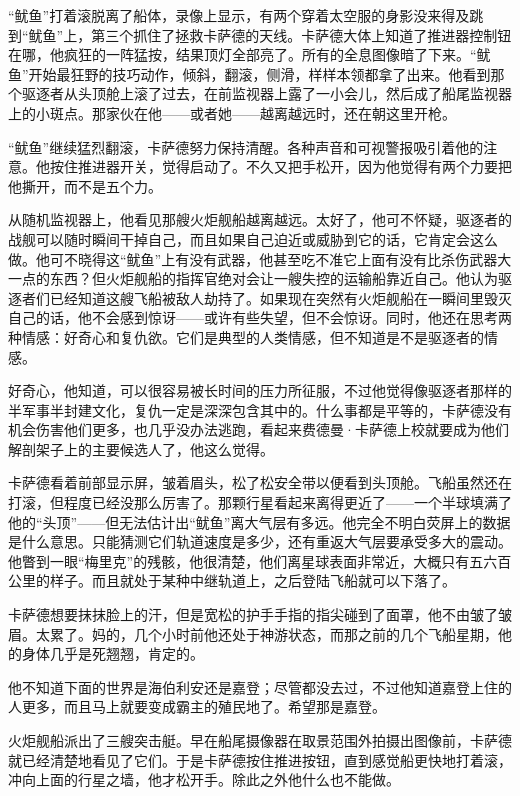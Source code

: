 \documentclass[AutoFakeBold=true]{book}
\begin{document}
``鱿鱼''打着滚脱离了船体，录像上显示，有两个穿着太空服的身影没来得及跳到``鱿鱼''上，第三个抓住了拯救卡萨德的天线。卡萨德大体上知道了推进器控制钮在哪，他疯狂的一阵猛按，结果顶灯全部亮了。所有的全息图像暗了下来。``鱿鱼''开始最狂野的技巧动作，倾斜，翻滚，侧滑，样样本领都拿了出来。他看到那个驱逐者从头顶舱上滚了过去，在前监视器上露了一小会儿，然后成了船尾监视器上的小斑点。那家伙在他——或者她——越离越远时，还在朝这里开枪。

``鱿鱼''继续猛烈翻滚，卡萨德努力保持清醒。各种声音和可视警报吸引着他的注意。他按住推进器开关，觉得启动了。不久又把手松开，因为他觉得有两个力要把他撕开，而不是五个力。

从随机监视器上，他看见那艘火炬舰船越离越远。太好了，他可不怀疑，驱逐者的战舰可以随时瞬间干掉自己，而且如果自己迫近或威胁到它的话，它肯定会这么做。他可不晓得这``鱿鱼''上有没有武器，他甚至吃不准它上面有没有比杀伤武器大一点的东西？但火炬舰船的指挥官绝对会让一艘失控的运输船靠近自己。他认为驱逐者们已经知道这艘飞船被敌人劫持了。如果现在突然有火炬舰船在一瞬间里毁灭自己的话，他不会感到惊讶——或许有些失望，但不会惊讶。同时，他还在思考两种情感：好奇心和复仇欲。它们是典型的人类情感，但不知道是不是驱逐者的情感。

好奇心，他知道，可以很容易被长时间的压力所征服，不过他觉得像驱逐者那样的半军事半封建文化，复仇一定是深深包含其中的。什么事都是平等的，卡萨德没有机会伤害他们更多，也几乎没办法逃跑，看起来费德曼·卡萨德上校就要成为他们解剖架子上的主要候选人了，他这么觉得。

卡萨德看着前部显示屏，皱着眉头，松了松安全带以便看到头顶舱。飞船虽然还在打滚，但程度已经没那么厉害了。那颗行星看起来离得更近了——一个半球填满了他的``头顶''——但无法估计出``鱿鱼''离大气层有多远。他完全不明白荧屏上的数据是什么意思。只能猜测它们轨道速度是多少，还有重返大气层要承受多大的震动。他瞥到一眼``梅里克''的残骸，他很清楚，他们离星球表面非常近，大概只有五六百公里的样子。而且就处于某种中继轨道上，之后登陆飞船就可以下落了。

卡萨德想要抹抹脸上的汗，但是宽松的护手手指的指尖碰到了面罩，他不由皱了皱眉。太累了。妈的，几个小时前他还处于神游状态，而那之前的几个飞船星期，他的身体几乎是死翘翘，肯定的。

他不知道下面的世界是海伯利安还是嘉登；尽管都没去过，不过他知道嘉登上住的人更多，而且马上就要变成霸主的殖民地了。希望那是嘉登。

火炬舰船派出了三艘突击艇。早在船尾摄像器在取景范围外拍摄出图像前，卡萨德就已经清楚地看见了它们。于是卡萨德按住推进按钮，直到感觉船更快地打着滚，冲向上面的行星之墙，他才松开手。除此之外他什么也不能做。
\end{document}
